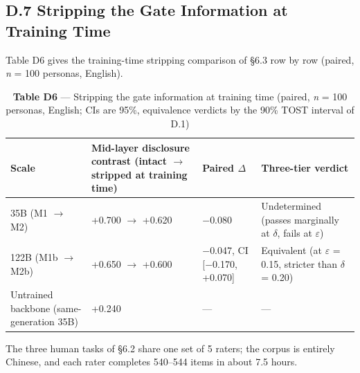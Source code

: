 \documentclass[letterpaper]{article}
\begin{document}
\subsection*{D.7 Stripping the Gate Information at Training Time}

Table D6 gives the training-time stripping comparison of \S{}6.3 row by row (paired, \textit{n} = 100 personas, English).


\begin{table}[t]
\centering\footnotesize
\setlength{\tabcolsep}{4pt}
\caption{\textbf{Table D6} --- Stripping the gate information at training time (paired, \textit{n} = 100 personas, English; CIs are 95\%, equivalence verdicts by the 90\% TOST interval of D.1)}
\begin{tabular}{@{}>{\raggedright\arraybackslash}p{}>{\raggedright\arraybackslash}p{}>{\raggedright\arraybackslash}p{}>{\raggedright\arraybackslash}p{}@{}}
\toprule
Scale & Mid-layer disclosure contrast (intact $\rightarrow$ stripped at training time) & Paired $\Delta$ & Three-tier verdict \\
\midrule
35B (M1 $\rightarrow$ M2) & +0.700 $\rightarrow$ +0.620 & $-$0.080 & Undetermined (passes marginally at $\delta$, fails at $\varepsilon$) \\
122B (M1b $\rightarrow$ M2b) & +0.650 $\rightarrow$ +0.600 & $-$0.047, CI [$-$0.170, +0.070] & Equivalent (at $\varepsilon$ = 0.15, stricter than $\delta$ = 0.20) \\
Untrained backbone (same-generation 35B) & +0.240 & --- & --- \\
\bottomrule
\end{tabular}
\end{table}




The three human tasks of \S{}6.2 share one set of 5 raters; the corpus is entirely Chinese, and each rater completes 540--544 items in about 7.5 hours.
\end{document}
